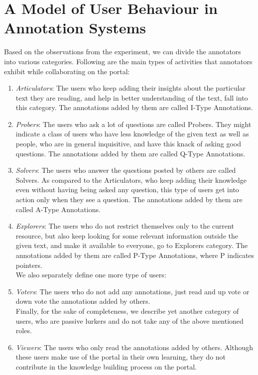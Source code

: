 \documentclass{llncs}
\begin{document}
\section{A Model of User Behaviour in Annotation Systems}
Based on the observations from the experiment, we can divide the annotators into various categories. Following are the main types of activities that annotators exhibit while collaborating on the portal:
\begin{enumerate}
\item \textit{Articulators}: The users who keep adding their insights about the particular text they are reading, and help in better understanding of the text, fall into this category. The annotations added by them are called I-Type Annotations.
\item \textit{Probers}: The users who ask a lot of questions are called Probers. They might indicate a class of users who have less knowledge of the given text as well as people, who are in general inquisitive, and have this knack of asking good questions. The annotations added by them are called Q-Type Annotations.
\item \textit{Solvers}: The users who answer the questions posted by others are called Solvers. As compared to the Articulators, who keep adding their knowledge even without having being asked any question, this type of users get into action only when they see a question. The annotations added by them are called A-Type Annotations.
\item \textit{Explorers}: The users who do not restrict themselves only to the current resource, but also keep looking for some relevant information outside the given text, and make it available to everyone, go to Explorers category. The annotations added by them are called P-Type Annotations, where P indicates pointers.\\
We also separately define one more type of users:
\item \textit{Voters}: The users who do not add any annotations, just read and up vote or down vote the annotations added by others. \\
Finally, for the sake of completeness, we describe yet another category of users, who are passive lurkers and do not take any of the above mentioned roles.
\item \textit{Viewers}: The users who only read the annotations added by others. Although these users make use of the portal in their own learning, they do not contribute in the knowledge building process on the portal. 
\end{enumerate}
\end{document}
